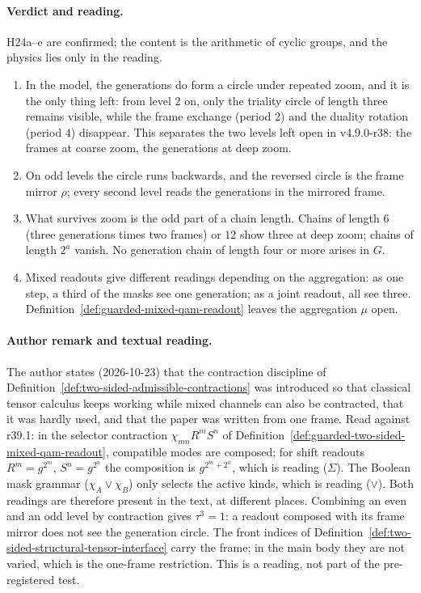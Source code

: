 \paragraph{Verdict and reading.}
H24a--e are confirmed; the content is the arithmetic of cyclic groups, and the physics lies only in the reading.
\begin{enumerate}[leftmargin=2em]
\item In the model, the generations do form a circle under repeated zoom, and it is the only thing left: from level \(2\) on, only the
triality circle of length three remains visible, while the frame exchange (period \(2\)) and the duality rotation (period \(4\))
disappear.  This separates the two levels left open in v4.9.0-r38: the frames at coarse zoom, the generations at deep zoom.
\item On odd levels the circle runs backwards, and the reversed circle is the frame mirror \(\rho\); every second level reads the
generations in the mirrored frame.
\item What survives zoom is the odd part of a chain length.  Chains of length \(6\) (three generations times two frames) or \(12\) show
three at deep zoom; chains of length \(2^a\) vanish.  No generation chain of length four or more arises in \(G\).
\item Mixed readouts give different readings depending on the aggregation: as one step, a third of the masks see one generation; as
a joint readout, all see three.  Definition~\ref{def:guarded-mixed-qam-readout} leaves the aggregation \(\mu\) open.
\end{enumerate}

\paragraph{Author remark and textual reading.}
The author states (2026-10-23) that the contraction discipline of Definition~\ref{def:two-sided-admissible-contractions} was
introduced so that classical tensor calculus keeps working while mixed channels can also be contracted, that it was hardly used, and
that the paper was written from one frame.  Read against r39.1: in the selector contraction \(\chi_{mn}R^mS^n\) of
Definition~\ref{def:guarded-two-sided-mixed-qam-readout}, compatible modes are composed; for shift readouts
\(R^m=g^{2^m}\), \(S^n=g^{2^n}\) the composition is \(g^{2^m+2^n}\), which is reading (\(\Sigma\)).  The Boolean mask grammar
(\(\chi_A\vee\chi_B\)) only selects the active kinds, which is reading (\(\vee\)).  Both readings are therefore present in the text, at
different places.  Combining an even and an odd level by contraction gives \(\tau^{3}=1\): a readout composed with its frame mirror
does not see the generation circle.  The front indices of Definition~\ref{def:two-sided-structural-tensor-interface} carry the frame;
in the main body they are not varied, which is the one-frame restriction.  This is a reading, not part of the pre-registered test.

